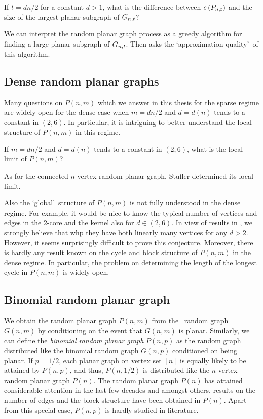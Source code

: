\begin{question}\label{que:largest_subgraph}
If $t=dn/2$ for a constant $d>1$, what is the difference between $e\left({P_{n,t}}\right)$ and the size of the largest planar subgraph of $G_{n,t}$?
\end{question}

We can interpret the random planar graph process as a greedy algorithm for finding a large planar subgraph of $G_{n,t}$. Then  asks the \lq approximation quality\rq\ of this algorithm.

\subsection{Dense random planar graphs}
Many questions on $P(n,m)$ which we answer in this thesis for the sparse regime are widely open for the dense case when $m=dn/2$ and $d=d(n)$ tends to a constant in $(2,6)$. In particular, it is intriguing to better understand the local structure of $P(n,m)$ in this regime.

\begin{question}\label{que:dense_local}
If $m=dn/2$ and $d=d(n)$ tends to a constant in $(2,6)$, what is the local limit of $P(n,m)$?
\end{question}

As for the connected $n$-vertex random planar graph, Stufler \cite{StuflerAppear} determined its local limit.

Also the \lq global\rq\ structure of $P(n,m)$ is not fully understood in the dense regime. For example, it would be nice to know the typical number of vertices and edges in the 2-core and the kernel also for $d\in(2,6)$. In view of results in \cite{KangLuczak2012,KangMosshammerSpruessel2020}, we strongly believe that whp they have both linearly many vertices for any $d>2$. However, it seems surprisingly difficult to prove this conjecture. Moreover, there is hardly any result known on the cycle and block structure of $P(n,m)$ in the dense regime. In particular, the problem on determining the length of the longest cycle in $P(n,m)$ is widely open.

\subsection{Binomial random planar graph}\label{sub:binom_planar}
We obtain the random planar graph $P(n,m)$ from the \ER\ random graph $G(n,m)$ by conditioning on the event that $G(n,m)$ is planar. Similarly, we can define the {\em binomial random planar graph} $P(n,p)$ as the random graph distributed like the binomial random graph $G(n,p)$ conditioned on being planar. If $p=1/2$, each planar graph on vertex set $[n]$ is equally likely to be attained by $P(n,p)$, and thus, $P(n,1/2)$ is distributed like the $n$-vertex random planar graph $P(n)$. The random planar graph $P(n)$ has attained considerable attention in the last few decades and amongst others, results on the number of edges \cite{GimenezNoy2009} and the block structure \cite{PanagiotouSteger2010} have been obtained in $P(n)$. Apart from this special case, $P(n,p)$ is hardly studied in literature.


